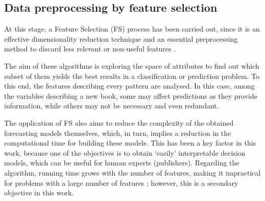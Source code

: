 \documentclass[a4paper,10pt,twocolumn,preprint,3p]{elsarticle}
\begin{document}
\subsection{Data preprocessing by feature selection}
\label{subsec:data_preproces}

At this stage, a Feature Selection (FS) process has been carried out, 
since it is an effective dimensionality reduction technique and an essential 
preprocessing method to discard less relevant or non-useful features 
\cite{Krishnapuram2004,Chen2011_FS_PTS}.

The aim of these algorithms is exploring the space of attributes to find out 
which subset of them yields the best results in a classification or prediction 
problem. To this end, the features describing every pattern are analysed. 
In this case, among the variables describing a new book, some may affect 
predictions as they provide information, while others may not be necessary 
and even redundant.

The application of FS also aims to reduce the complexity of the obtained 
forecasting models themselves, which, in turn, implies a reduction in the 
computational time for building these models. This has been a key 
factor in this work, because one of the objectives is to obtain `easily' 
interpretable decision models, which can be useful for human experts (publishers).
Regarding the algorithm, running time grows with the number of
features, making it impractical for problems with a large number of features 
\cite{Selvakuberan2008}; however, this is a secondary objective in this work.



\end{document}

